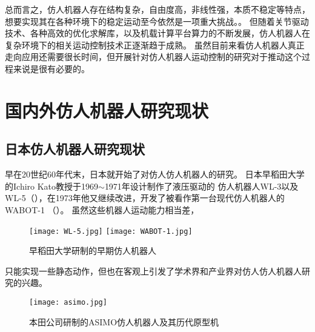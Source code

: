 总而言之，仿人机器人存在结构复杂，自由度高，非线性强，本质不稳定等特点\cite{2010067776.nh}，想要实现其在各种环境下的稳定运动至今依然是一项重大挑战。。
但随着关节驱动技术、各种高效的优化求解库，以及机载计算平台算力的不断发展，仿人机器人在复杂环境下的相关运动控制技术正逐渐趋于成熟。
虽然目前来看仿人机器人真正走向应用还需要很长时间，但开展针对仿人机器人运动控制的研究对于推动这个过程来说是很有必要的。
\section{国内外仿人机器人研究现状}
\subsection{日本仿人机器人研究现状}
早在20世纪60年代末，日本就开始了对仿人仿人机器人的研究。
日本早稻田大学的Ichiro Kato教授于1969$\sim$1971年设计制作了液压驱动的
仿人机器人WL-3以及WL-5（），在1973年他又继续改进，开发了被看作第一台现代仿人机器人的WABOT-1 （）。
虽然这些机器人运动能力相当差，
\begin{figure}[htbp]
    \centering
        {%
            \texttt{[image: WL-5.jpg]}}
        {%
            \texttt{[image: WABOT-1.jpg]}}
    \caption{早稻田大学研制的早期仿人机器人\label{fig:japan_old}}
\end{figure}
只能实现一些静态动作，但也在客观上引发了学术界和产业界对仿人仿人机器人研究的兴趣。
\begin{figure}[htbp]
    \centering
    \texttt{[image: asimo.jpg]}
    \caption{\label{fig:asimo}本田公司研制的ASIMO仿人机器人及其历代原型机}
\end{figure}

